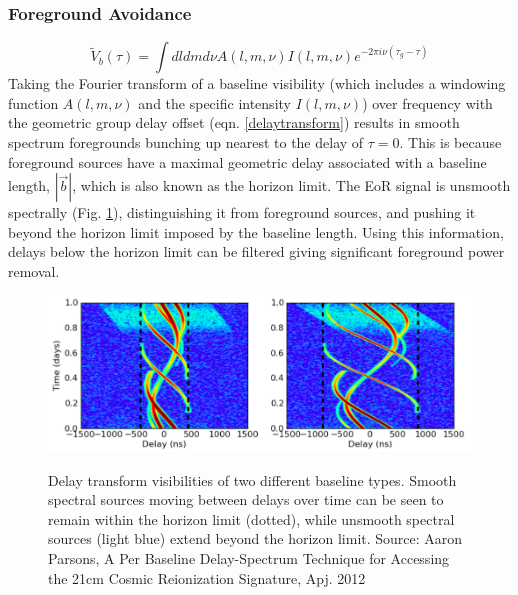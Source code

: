\documentclass[a0,landscape]{a0poster}
\begin{document}
\begin{multicols}{4}
\subsubsection*{Foreground Avoidance}
\begin{equation}
\label{delaytransform}
\widetilde{V}_b(\tau) = \int dl dm d\nu A(l,m,\nu)I(l,m,\nu)e^{-2\pi i\nu(\tau_g -\tau)}
\end{equation}
Taking the Fourier transform of a baseline visibility (which includes a windowing function $A(l,m,\nu)$ and the specific intensity $I(l,m,\nu)$) over frequency with the geometric group delay offset (eqn. \ref{delaytransform}) results in 
smooth spectrum foregrounds bunching up nearest to the delay of $\tau = 0$. This is because foreground sources have a maximal geometric 
delay associated with a baseline length, $|\vec{b}|$, which is also known as the horizon limit. The EoR signal is unsmooth spectrally (Fig. \ref{fig:delayspace}), 
distinguishing it from foreground sources, and pushing it beyond the horizon limit imposed by the baseline length. Using this information, 
delays below the horizon limit can be filtered giving significant foreground power removal.

\begin{figure}[H]
\centering
\includegraphics[width=0.8\linewidth]{figures/delaytransform.png}\\
\caption{Delay transform visibilities of two different baseline types. Smooth spectral sources moving between delays over time can be seen to remain within the horizon limit (dotted), while unsmooth spectral sources (light blue) extend beyond the horizon limit.  Source: Aaron Parsons, A Per Baseline Delay-Spectrum Technique for Accessing the 21cm Cosmic Reionization Signature, Apj. 2012}
\label{fig:delayspace}
\end{figure}





\end{multicols}
\end{document}
